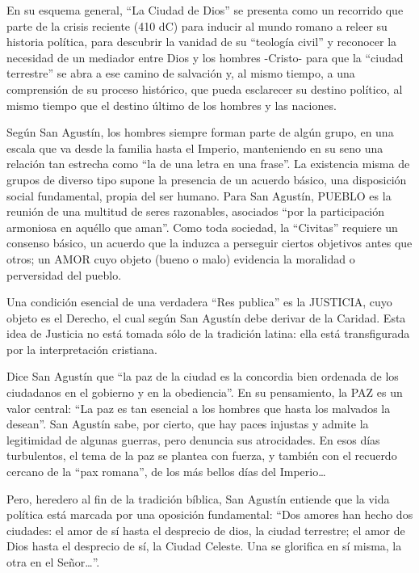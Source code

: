 \documentclass[
]{book}
\begin{document}
En su esquema general, ``La Ciudad de Dios'' se presenta como un recorrido que parte de la crisis reciente (410 dC) para inducir al mundo romano a releer su historia política, para descubrir la vanidad de su ``teología civil'' y reconocer la necesidad de un mediador entre Dios y los hombres -Cristo- para que la ``ciudad terrestre'' se abra a ese camino de salvación y, al mismo tiempo, a una comprensión de su proceso histórico, que pueda esclarecer su destino político, al mismo tiempo que el destino último de los hombres y las naciones.

Según San Agustín, los hombres siempre forman parte de algún grupo, en una escala que va desde la familia hasta el Imperio, manteniendo en su seno una relación tan estrecha como ``la de una letra en una frase''. La existencia misma de grupos de diverso tipo supone la presencia de un acuerdo básico, una disposición social fundamental, propia del ser humano. Para San Agustín, PUEBLO es la reunión de una multitud de seres razonables, asociados ``por la participación armoniosa en aquéllo que aman''. Como toda sociedad, la ``Civitas'' requiere un consenso básico, un acuerdo que la induzca a perseguir ciertos objetivos antes que otros; un AMOR cuyo objeto (bueno o malo) evidencia la moralidad o perversidad del pueblo.

Una condición esencial de una verdadera ``Res publica'' es la JUSTICIA, cuyo objeto es el Derecho, el cual según San Agustín debe derivar de la Caridad. Esta idea de Justicia no está tomada sólo de la tradición latina: ella está transfigurada por la interpretación cristiana.

Dice San Agustín que ``la paz de la ciudad es la concordia bien ordenada de los ciudadanos en el gobierno y en la obediencia''. En su pensamiento, la PAZ es un valor central: ``La paz es tan esencial a los hombres que hasta los malvados la desean''. San Agustín sabe, por cierto, que hay paces injustas y admite la legitimidad de algunas guerras, pero denuncia sus atrocidades. En esos días turbulentos, el tema de la paz se plantea con fuerza, y también con el recuerdo cercano de la ``pax romana'', de los más bellos días del Imperio\ldots{}

Pero, heredero al fin de la tradición bíblica, San Agustín entiende que la vida política está marcada por una oposición fundamental: ``Dos amores han hecho dos ciudades: el amor de sí hasta el desprecio de dios, la ciudad terrestre; el amor de Dios hasta el desprecio de sí, la Ciudad Celeste. Una se glorifica en sí misma, la otra en el Señor\ldots{}''.
\end{document}
